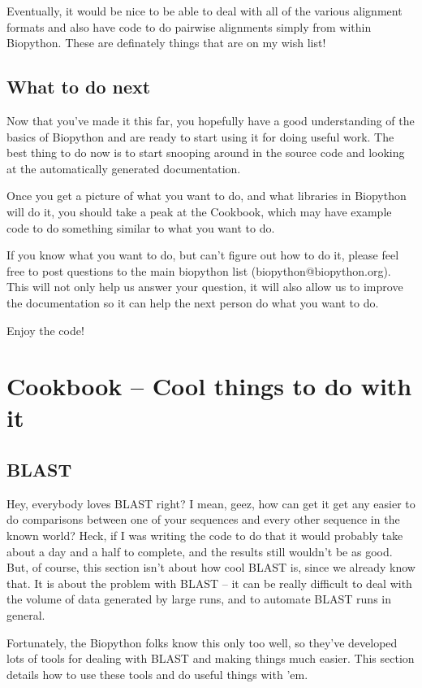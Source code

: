 \documentclass{article}
\begin{document}
Eventually, it would be nice to be able to deal with all of the various alignment formats and also have code to do pairwise alignments simply from within Biopython. These are definately things that are on my wish list!

\subsection{What to do next}

Now that you've made it this far, you hopefully have a good understanding of the basics of Biopython and are ready to start using it for doing useful work. The best thing to do now is to start snooping around in the source code and looking at the automatically generated documentation. 


Once you get a picture of what you want to do, and what libraries in Biopython will do it, you should take a peak at the Cookbook, which may have example code to do something similar to what you want to do. 


If you know what you want to do, but can't figure out how to do it, please feel free to post questions to the main biopython list (biopython@biopython.org). This will not only help us answer your question, it will also allow us to improve the documentation so it can help the next person do what you want to do.


Enjoy the code!

\section{Cookbook -- Cool things to do with it}

\subsection{BLAST}

Hey, everybody loves BLAST right? I mean, geez, how can get it get any easier to do comparisons between one of your sequences and every other sequence in the known world? Heck, if I was writing the code to do that it would probably take about a day and a half to complete, and the results still wouldn't be as good. But, of course, this section isn't about how cool BLAST is, since we already know that. It is about the problem with BLAST -- it can be really difficult to deal with the volume of data generated by large runs, and to automate BLAST runs in general.


Fortunately, the Biopython folks know this only too well, so they've developed lots of tools for dealing with BLAST and making things much easier. This section details how to use these tools and do useful things with 'em. 
\end{document}

